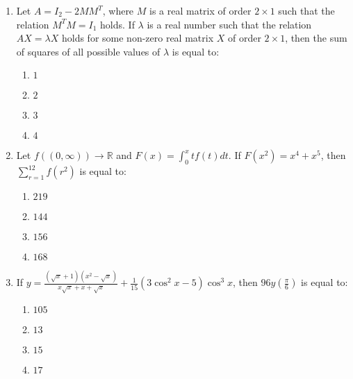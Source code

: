 \documentclass[journal]{IEEEtran}
\newcommand{\brak}[1]{\left( #1 \right)}
\begin{document}
\begin{enumerate}
        \begin{multicols}{4}
        \begin{enumerate}
        \item $1$
        \item $7$
        \item $8$
        \item $9$
        \end{enumerate}
        \end{multicols}

    \item Let $A=I_{2}-2MM^{T}$, where $M$ is a real matrix of order $2\times1$ such that the relation $M^{T}M=I_{1}$ holds. If $\lambda$ is a real number such that the relation $AX=\lambda X$ holds for some non-zero real matrix $X$ of order $2\times1$, then the sum of squares of all possible values of $\lambda$ is equal to:

        \begin{multicols}{4}
        \begin{enumerate}
        \item $1$
        \item $2$
        \item $3$
        \item $4$
        \end{enumerate}
        \end{multicols}
                
    \item Let $f\brak{\brak{0,\infty}}\rightarrow\mathbb{R}$ and $F\brak{x}=\int_{0}^{x}tf\brak{t}dt$. If $F\brak{x^{2}}=x^{4}+x^{5}$, then $\sum_{r=1}^{12}f\brak{r^{2}}$ is equal to:

        \begin{multicols}{4}
        \begin{enumerate}
        \item $219$
        \item $144$
        \item $156$
        \item $168$
        \end{enumerate}
        \end{multicols}   

    \item If $y=\frac{\brak{\sqrt{x}+1}\brak{x^{2}-\sqrt{x}}}{x\sqrt{x}+x+\sqrt{x}}+\frac{1}{15}\brak{3\cos^{2}x-5}\cos^{3}x$, then $96y\brak{\frac{\pi}{6}}$ is equal to:

        \begin{multicols}{4}
        \begin{enumerate}
        \item $105$
        \item $13$
        \item $15$
        \item $17$
        \end{enumerate}
        \end{multicols}


\end{enumerate}
\end{document}
